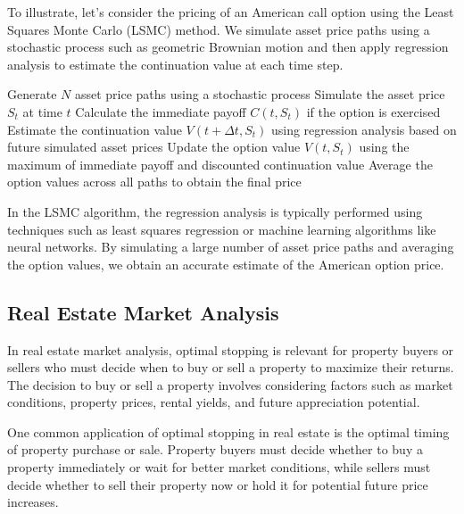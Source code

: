 \documentclass[12pt]{book} %
\begin{document}
To illustrate, let's consider the pricing of an American call option using the Least Squares Monte Carlo (LSMC) method. We simulate asset price paths using a stochastic process such as geometric Brownian motion and then apply regression analysis to estimate the continuation value at each time step.

\FloatBarrier
\begin{algorithm}
\caption{Least Squares Monte Carlo (LSMC) for American Call Option Pricing}
\begin{algorithmic}[1]
\State Generate \(N\) asset price paths using a stochastic process
        \State Simulate the asset price \(S_t\) at time \(t\)
        \State Calculate the immediate payoff \(C(t, S_t)\) if the option is exercised
        \State Estimate the continuation value \(V(t + \Delta t, S_t)\) using regression analysis based on future simulated asset prices
        \State Update the option value \(V(t, S_t)\) using the maximum of immediate payoff and discounted continuation value
    \EndFor
\EndFor
\State Average the option values across all paths to obtain the final price
\end{algorithmic}
\end{algorithm}
\FloatBarrier

In the LSMC algorithm, the regression analysis is typically performed using techniques such as least squares regression or machine learning algorithms like neural networks. By simulating a large number of asset price paths and averaging the option values, we obtain an accurate estimate of the American option price.

\subsection{Real Estate Market Analysis}

In real estate market analysis, optimal stopping is relevant for property buyers or sellers who must decide when to buy or sell a property to maximize their returns. The decision to buy or sell a property involves considering factors such as market conditions, property prices, rental yields, and future appreciation potential.

One common application of optimal stopping in real estate is the optimal timing of property purchase or sale. Property buyers must decide whether to buy a property immediately or wait for better market conditions, while sellers must decide whether to sell their property now or hold it for potential future price increases.
\end{document}
